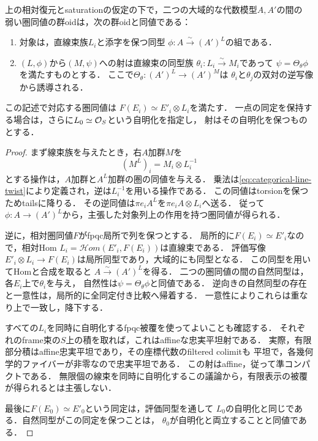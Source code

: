 \begin{proposition}[弱い射の線束による記述]
\label{prop:categorical-relative-descent}
上の相対復元とsaturationの仮定の下で，二つの大域的な代数模型$A,A'$の間の
弱い圏同値の群oidは，次の群oidと同値である：
\begin{enumerate}[label=\textup{(\roman*)}]
\item 対象は，直線束族$L_i$と添字を保つ同型
$\phi:A\xrightarrow{\sim}(A')^L$の組である．
\item $(L,\phi)$から$(M,\psi)$への射は直線束の同型族
$\theta_i:L_i\xrightarrow{\sim}M_i$であって
$\psi=\Theta_\theta\phi$を満たすものとする．
ここで$\Theta_\theta:(A')^L\to(A')^M$は
$\theta_i$と$\theta_j$の双対の逆写像から誘導される．
\end{enumerate}
この記述で対応する圏同値は
$F(E_i)\simeq E'_i\otimes L_i$を満たす．
一点の同定を保持する場合は，さらに$L_0\simeq\mathcal O_S$という自明化を指定し，
射はその自明化を保つものとする．
\end{proposition}
\begin{proof}
まず線束族を与えたとき，右$A$加群$M$を
\[
 (M^L)_i=M_i\otimes L_i^{-1}
\]
とする操作は，$A$加群と$A^L$加群の圏の同値を与える．
乗法は\eqref{eq:categorical-line-twist}により定義され，逆は$L_i^{-1}$を用いる操作である．
この同値はtorsionを保つためtailsに降りる．
その逆同値は$\pi e_iA^L$を$\pi e_iA\otimes L_i$へ送る．
従って$\phi:A\to(A')^L$から，主張した対象列上の作用を持つ圏同値が得られる．

逆に，相対圏同値$F$がfpqc局所で列を保つとする．
局所的に$F(E_i)\simeq E'_i$なので，相対Hom
$L_i=\mathcal Hom(E'_i,F(E_i))$は直線束である．
評価写像$E'_i\otimes L_i\to F(E_i)$は局所同型であり，大域的にも同型となる．
この同型を用いてHomと合成を取ると
$A\xrightarrow{\sim}(A')^L$を得る．
二つの圏同値の間の自然同型は，各$E_i$上で$\theta_i$を与え，
自然性は$\psi=\Theta_\theta\phi$と同値である．
逆向きの自然同型の存在と一意性は，局所的に全同定付き比較へ帰着する．
一意性によりこれらは重なり上で一致し，降下する．

すべての$L_i$を同時に自明化するfpqc被覆を使ってよいことも確認する．
それぞれのframe束の$S$上の積を取れば，これはaffineな忠実平坦射である．
実際，有限部分積はaffine忠実平坦であり，その座標代数のfiltered colimitも
平坦で，各幾何学的ファイバーが非零なので忠実平坦である．
この射はaffine，従って準コンパクトである．
無限個の線束を同時に自明化するこの議論から，有限表示の被覆が得られるとは主張しない．

最後に$F(E_0)\simeq E'_0$という同定は，評価同型を通して
$L_0$の自明化と同じである．自然同型がこの同定を保つことは，
$\theta_0$が自明化と両立することと同値である．
\end{proof}

